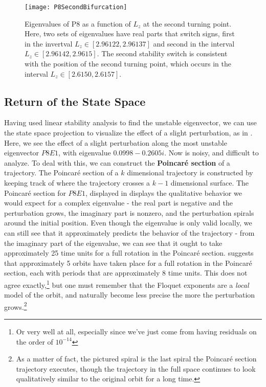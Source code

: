\begin{figure}[h]
\texttt{[image: P8SecondBifurcation]}
\caption{Eigenvalues of P8 as a function of $L_z$ at the second turning point. Here, two sets of eigenvalues have real parts that switch signs, first in the invertval $L_z \in [2.96122,2.96137]$ and second in the interval $L_z \in [ 2.96142,2.9615]$. The second stability switch is consistent with the position of the second turning point, which occurs in the interval $L_z \in [2.6150,2.6157]$.}\label{fig:P8SecondBifurcation}
\end{figure}

\subsection{Return of the State Space}

Having used linear stability analysis to find the unstable eigenvector, we can use the state space projection to visualize the effect of a slight perturbation, as  in . Here, we see the effect of a slight perturbation along the most unstable eigenvector $P8E1$, with eigenvalue $0.0998 - 0.2605 i$. Now  is noisy, and difficult to analyze. To deal with this, we can construct the {\bf Poincaré section} of a trajectory. The Poincaré section of a $k$ dimensional trajectory is constructed by keeping track of where the trajectory crosses a $k-1$ dimensional surface. The Poincaré section for  $P8E1$, displayed in  displays the qualitative behavior we would expect for a complex eigenvalue - the real part is negative and the perturbation grows, the imaginary part is nonzero, and the perturbation spirals around the initial position. Even though the eigenvalue is only valid locally, we can still see that it approximately predicts the behavior of the trajectory - from the imaginary part of the eigenvalue, we can see that it ought to take approximately 25 time units for a full rotation in the Poincaré section.  suggests that approximately 5 orbits have taken place for a full rotation in the Poincaré section, each with periods that are approximately 8 time units. This does not agree exactly,\footnote{Or very well at all, especially since we've just come from having residuals on the order of $10^{-14}$} but one must remember that the Floquet exponents are a \emph{local} model of the orbit, and naturally become less precise the more the perturbation grows.\footnote{As a matter of fact, the pictured spiral is the last spiral the Poincaré section trajectory executes, though the trajectory in the full space continues to look qualitatively similar to the original orbit for a long time.}   


